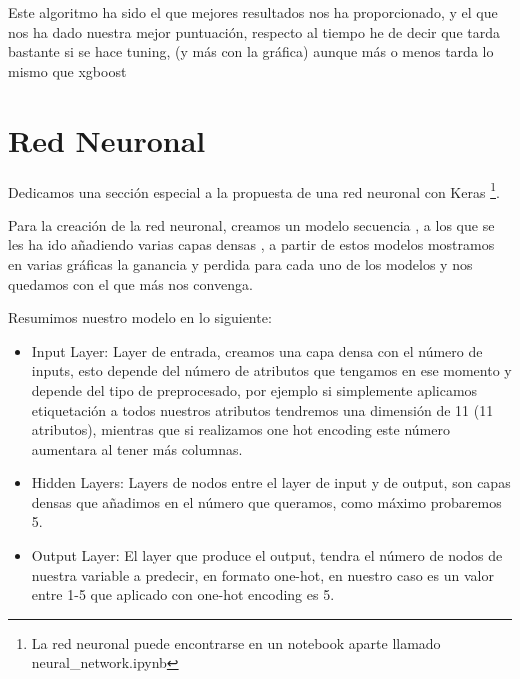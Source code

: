 \documentclass[12pt,twoside]{report}
\begin{document}
Este algoritmo ha sido el que mejores resultados nos ha proporcionado, y el que nos ha dado nuestra mejor puntuación, respecto al tiempo he de decir que tarda bastante si se hace tuning, (y más con la gráfica) aunque más o menos tarda lo mismo que xgboost
\section*{Red Neuronal}

Dedicamos una sección especial a la propuesta de una red neuronal con Keras \footnote{La red neuronal puede encontrarse en un notebook aparte llamado neural\_network.ipynb}.

Para la creación de la red neuronal, creamos un modelo secuencia \cite{keras-sequential}, a los que se les ha ido añadiendo varias capas densas \cite{keras-dense}, a partir de estos modelos mostramos en varias gráficas la ganancia y perdida para cada uno de los modelos y nos quedamos con el que más nos convenga.

Resumimos nuestro modelo en lo siguiente:

\begin{itemize}
	\item Input Layer: Layer de entrada, creamos una capa densa con el número de inputs, esto depende del número de atributos que tengamos en ese momento y depende del tipo de preprocesado, por ejemplo si simplemente aplicamos etiquetación a todos nuestros atributos tendremos una dimensión de 11 (11 atributos), mientras que si realizamos one hot encoding este número aumentara al tener más columnas.
	\item Hidden Layers: Layers de nodos entre el layer de input y de output, son capas densas que añadimos en el número que queramos, como máximo probaremos 5.
	\item Output Layer: El layer que produce el output, tendra el número de nodos de nuestra variable a predecir, en formato one-hot, en nuestro caso es un valor entre 1-5 que aplicado con one-hot encoding es 5.
\end{itemize}
\end{document}
